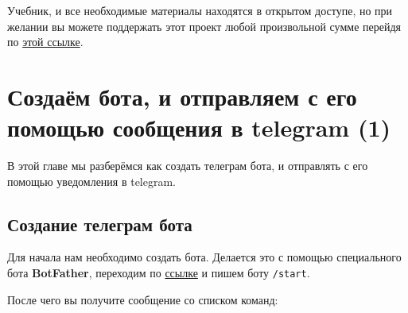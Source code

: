 \documentclass[
]{book}
\begin{document}
Учебник, и все необходимые материалы находятся в открытом доступе, но при желании вы можете поддержать этот проект любой произвольной сумме перейдя по \href{https://secure.wayforpay.com/payment/build_telegram_bot_using_r}{этой ссылке}.

\hypertarget{ux441ux43eux437ux434ux430ux451ux43c-ux431ux43eux442ux430-ux438-ux43eux442ux43fux440ux430ux432ux43bux44fux435ux43c-ux441-ux435ux433ux43e-ux43fux43eux43cux43eux449ux44cux44e-ux441ux43eux43eux431ux449ux435ux43dux438ux44f-ux432-telegram-1}{%
\chapter{Создаём бота, и отправляем с его помощью сообщения в telegram (1)}\label{ux441ux43eux437ux434ux430ux451ux43c-ux431ux43eux442ux430-ux438-ux43eux442ux43fux440ux430ux432ux43bux44fux435ux43c-ux441-ux435ux433ux43e-ux43fux43eux43cux43eux449ux44cux44e-ux441ux43eux43eux431ux449ux435ux43dux438ux44f-ux432-telegram-1}}

В этой главе мы разберёмся как создать телеграм бота, и отправлять с его помощью уведомления в telegram.

\hypertarget{ux441ux43eux437ux434ux430ux43dux438ux435-ux442ux435ux43bux435ux433ux440ux430ux43c-ux431ux43eux442ux430}{%
\section{Создание телеграм бота}\label{ux441ux43eux437ux434ux430ux43dux438ux435-ux442ux435ux43bux435ux433ux440ux430ux43c-ux431ux43eux442ux430}}

Для начала нам необходимо создать бота. Делается это с помощью специального бота \textbf{BotFather}, переходим по \href{https://t.me/BotFather}{ссылке} и пишем боту \texttt{/start}.

После чего вы получите сообщение со списком команд:
\end{document}
